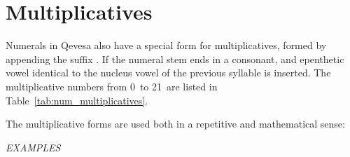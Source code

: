 \documentclass[grammar]{subfiles}
\begin{document}
  \section{Multiplicatives}
  \label{sec:num_multiplicatives}

  Numerals in Qevesa also have a special form for multiplicatives, formed by appending the suffix . If the numeral stem ends in a consonant, and epenthetic vowel identical to the nucleus vowel of the previous syllable is inserted. The multiplicative numbers from 0\dec\ to 21\dec\ are listed in Table~\ref{tab:num_multiplicatives}.

  \begin{table}[htpb]\small\capstart
      \qquad
      \caption{Multiplicative numerals from 0\dec\ to 21\dec\label{tab:num_multiplicatives}}
  \end{table}

  The multiplicative forms are used both in a repetitive and mathematical sense:

  \begin{exe}
    \ex \emph{EXAMPLES}
  \end{exe}
\end{document}
